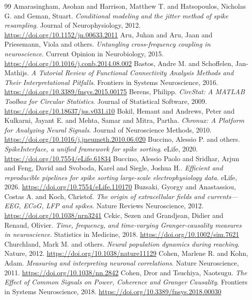 \begin{thebibliography}{99}
 Amarasingham, Asohan and Harrison, Matthew T. and Hatsopoulos, Nicholas G. and Geman, Stuart. \emph{Conditional modeling and the jitter method of spike resampling}. Journal of Neurophysiology, 2012. \url{https://doi.org/10.1152/jn.00633.2011}
 Aru, Juhan and Aru, Jaan and Priesemann, Viola and others. \emph{Untangling cross-frequency coupling in neuroscience}. Current Opinion in Neurobiology, 2015. \url{https://doi.org/10.1016/j.conb.2014.08.002}
 Bastos, Andre M. and Schoffelen, Jan-Mathijs. \emph{A Tutorial Review of Functional Connectivity Analysis Methods and Their Interpretational Pitfalls}. Frontiers in Systems Neuroscience, 2016. \url{https://doi.org/10.3389/fnsys.2015.00175}
 Berens, Philipp. \emph{CircStat: A MATLAB Toolbox for Circular Statistics}. Journal of Statistical Software, 2009. \url{https://doi.org/10.18637/jss.v031.i10}
 Bokil, Hemant and Andrews, Peter and Kulkarni, Jayant E. and Mehta, Samar and Mitra, Partha. \emph{Chronux: A Platform for Analyzing Neural Signals}. Journal of Neuroscience Methods, 2010. \url{https://doi.org/10.1016/j.jneumeth.2010.06.020}
 Buccino, Alessio P. and others. \emph{SpikeInterface, a unified framework for spike sorting}. eLife, 2020. \url{https://doi.org/10.7554/eLife.61834}
 Buccino, Alessio Paolo and Sridhar, Arjun and Feng, David and Svoboda, Karel and Siegle, Joshua H.. \emph{Efficient and reproducible pipelines for spike sorting large-scale electrophysiology data}. eLife, 2026. \url{https://doi.org/10.7554/eLife.110170}
 Buzsaki, Gyorgy and Anastassiou, Costas A. and Koch, Christof. \emph{The origin of extracellular fields and currents---EEG, ECoG, LFP and spikes}. Nature Reviews Neuroscience, 2012. \url{https://doi.org/10.1038/nrn3241}
 Cekic, Sezen and Grandjean, Didier and Renaud, Olivier. \emph{Time, frequency, and time-varying Granger-causality measures in neuroscience}. Statistics in Medicine, 2018. \url{https://doi.org/10.1002/sim.7621}
 Churchland, Mark M. and others. \emph{Neural population dynamics during reaching}. Nature, 2012. \url{https://doi.org/10.1038/nature11129}
 Cohen, Marlene R. and Kohn, Adam. \emph{Measuring and interpreting neuronal correlations}. Nature Neuroscience, 2011. \url{https://doi.org/10.1038/nn.2842}
 Cohen, Dror and Tsuchiya, Naotsugu. \emph{The Effect of Common Signals on Power, Coherence and Granger Causality}. Frontiers in Systems Neuroscience, 2018. \url{https://doi.org/10.3389/fnsys.2018.00030}

\end{thebibliography}
